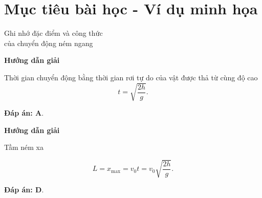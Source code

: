 \section{Mục tiêu bài học - Ví dụ minh họa}
\begin{dang}{Ghi nhớ đặc điểm và công thức \\ của chuyển động ném ngang}
	{	\begin{center}
			\textbf{Hướng dẫn giải}
		\end{center}
		
		Thời gian chuyển động bằng thời gian rơi tự do của vật được thả từ cùng độ cao
		\begin{equation*}
			t=\sqrt{\dfrac{2h}{g}}.
		\end{equation*}
		
		\textbf{Đáp án: A}.
	}
	{	\begin{center}
			\textbf{Hướng dẫn giải}
		\end{center}
		
		Tầm ném xa
		
		\begin{equation*}
			L = x_{\text{max}} = v_0 t = v_0 \sqrt{\dfrac{2h}{g}}.
		\end{equation*}
		
		\textbf{Đáp án: D}.
	}
\end{dang}
